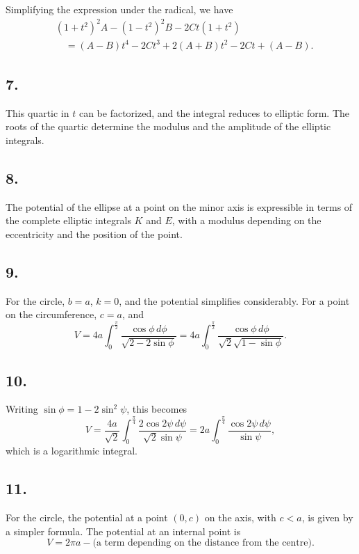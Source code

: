 \documentclass[11pt,a4paper]{book}
\begin{document}
Simplifying the expression under the radical, we have
\begin{align*}
&(1+t^2)^2A - (1-t^2)^2B - 2Ct(1+t^2) \\
&\quad = (A-B)t^4 - 2Ct^3 + 2(A+B)t^2 - 2Ct + (A-B).
\end{align*}

\subsection*{7.}

This quartic in $t$ can be factorized, and the integral reduces to elliptic
form. The roots of the quartic determine the modulus and the amplitude of
the elliptic integrals.

\newpage
\subsection*{8.}

The potential of the ellipse at a point on the minor axis is expressible in
terms of the complete elliptic integrals $K$ and $E$, with a modulus depending
on the eccentricity and the position of the point.

\subsection*{9.}

For the circle, $b=a$, $k=0$, and the potential simplifies considerably.
For a point on the circumference, $c=a$, and
\[
V = 4a \int_0^{\frac{\pi}{2}} \frac{\cos\phi\,d\phi}{\sqrt{2-2\sin\phi}}
  = 4a \int_0^{\frac{\pi}{2}}
    \frac{\cos\phi\,d\phi}{\sqrt{2}\sqrt{1-\sin\phi}}.
\]

\subsection*{10.}

Writing $\sin\phi=1-2\sin^2\psi$, this becomes
\[
V = \frac{4a}{\sqrt{2}} \int_0^{\frac{\pi}{4}}
    \frac{2\cos 2\psi\,d\psi}{\sqrt{2}\sin\psi}
  = 2a \int_0^{\frac{\pi}{4}} \frac{\cos 2\psi\,d\psi}{\sin\psi},
\]
which is a logarithmic integral.

\subsection*{11.}

For the circle, the potential at a point $(0,c)$ on the axis, with $c<a$,
is given by a simpler formula. The potential at an internal point is
\[
V = 2\pi a - \text{(a term depending on the distance from the centre)}.
\]
\end{document}
